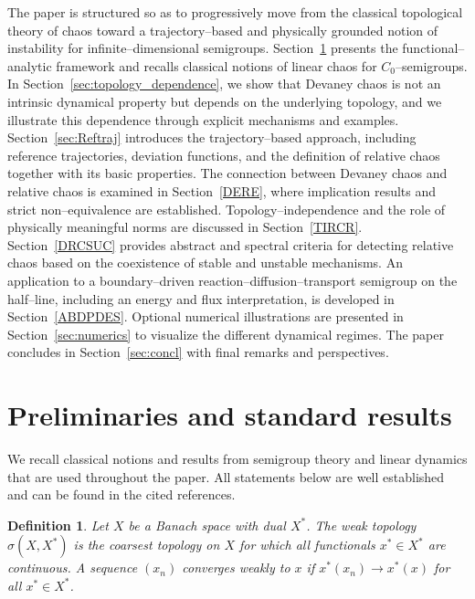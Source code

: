 \documentclass[12pt]{article}
\newtheorem{definition}[theorem]{Definition}
\begin{document}
The paper is structured so as to progressively move from the classical topological theory of chaos toward a trajectory--based and physically grounded notion of instability for infinite--dimensional semigroups. Section~\ref{sec:preliminaries} presents the functional--analytic framework and recalls classical notions of linear chaos for $C_0$--semigroups. In Section~\ref{sec:topology_dependence}, we show that Devaney chaos is not an intrinsic dynamical property but depends on the underlying topology, and we illustrate this dependence through explicit mechanisms and examples. Section~\ref{sec:Reftraj} introduces the trajectory--based approach, including reference trajectories, deviation functions, and the definition of relative chaos together with its basic properties. The connection between Devaney chaos and relative chaos is examined in Section~\ref{DERE}, where implication results and strict non--equivalence are established. Topology--independence and the role of physically meaningful norms are discussed in Section~\ref{TIRCR}. Section~\ref{DRCSUC} provides abstract and spectral criteria for detecting relative chaos based on the coexistence of stable and unstable mechanisms. An application to a boundary--driven reaction--diffusion--transport semigroup on
the half--line, including an energy and flux interpretation, is developed in Section~\ref{ABDPDES}. Optional numerical illustrations are presented in Section~\ref{sec:numerics} to visualize the different dynamical regimes. The paper concludes in Section~\ref{sec:concl} with final remarks and perspectives.


\section{Preliminaries and standard results}
\label{sec:preliminaries}

We recall classical notions and results from semigroup theory and linear dynamics that are used throughout the paper. All statements below are well established and can be found in the cited references.

\begin{definition}\cite{Brezis2011}
Let $X$ be a Banach space with dual $X^\ast$.
The \emph{weak topology} $\sigma(X,X^\ast)$ is the coarsest topology on $X$ for which all functionals $x^\ast\in X^\ast$ are continuous.
A sequence $(x_n)$ converges weakly to $x$ if $x^\ast(x_n)\to x^\ast(x)$ for all $x^\ast\in X^\ast$.
\end{definition}
\end{document}

